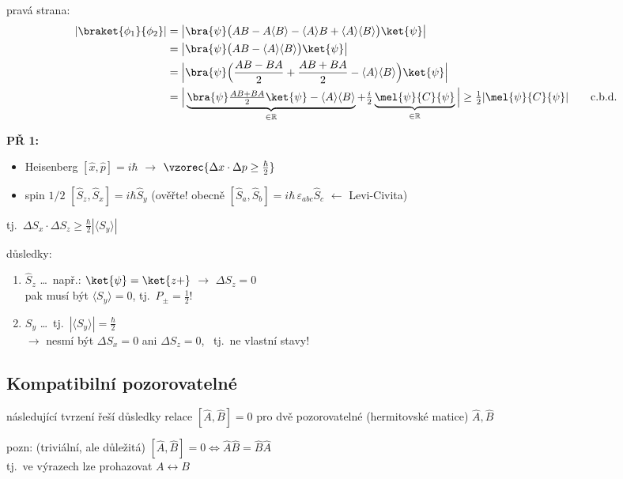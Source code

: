 \documentclass[11pt,a4paper]{article}
\begin{document}
pravá strana:
\begin{align*}
  |\braket{\phi_1}{\phi_2}| &= \big|\bra{\psi}\big(AB - A\langle B\rangle - \langle A\rangle B + \langle A\rangle\langle B\rangle\big)\ket{\psi}\big| \\
  &= \big|\bra{\psi}\big(AB - \langle A\rangle\langle B\rangle\big)\ket{\psi}\big| \\
  &= \Big|\bra{\psi}\Big(\frac{AB - BA}{2} + \frac{AB + BA}{2} - \langle A\rangle\langle B\rangle\Big)\ket{\psi}\Big| \\
  &= \Big|\underbrace{\bra{\psi}\tfrac{AB+BA}{2}\ket{\psi} - \langle A\rangle\langle B\rangle}_{\in\mathbb{R}}
     + \tfrac{i}{2}\underbrace{\mel{\psi}{C}{\psi}}_{\in\mathbb{R}}\Big|
     \geq \tfrac12|\mel{\psi}{C}{\psi}| \qquad\text{c.b.d.}
\end{align*}

\textbf{PŘ 1:}
\begin{itemize}[nosep]
  \item Heisenberg \quad $[\hat x,\hat p] = i\hbar$ \quad $\to$ \quad $\vzorec{\Delta x\cdot\Delta p \geq \frac{\hbar}{2}}$
  \item spin $1/2$ \quad $[\hat S_z,\hat S_x] = i\hbar\hat S_y$ \quad (ověřte! \quad obecně $[\hat S_a,\hat S_b] = i\hbar\,\varepsilon_{abc}\hat S_c$ \quad $\leftarrow$ Levi-Civita)
\end{itemize}
\quad tj.\ \quad $\Delta S_x\cdot\Delta S_z \geq \frac{\hbar}{2}|\langle S_y\rangle|$

důsledky:
\begin{enumerate}[label=\arabic*)]
  \item {} $\hat S_z$ \dots\ např.: $\ket{\psi} = \ket{z+}$ $\to$ $\Delta S_z = 0$ \\
        pak musí být $\langle S_y\rangle = 0$, tj.\ $P_\pm = \frac12$!
  \item {} $S_y$ \dots\ tj.\ $|\langle S_y\rangle| = \frac{\hbar}{2}$ \\
        $\to$ nesmí být $\Delta S_x = 0$ ani $\Delta S_z = 0$, \ tj.\ ne vlastní stavy!
\end{enumerate}

\subsection*{Kompatibilní pozorovatelné}
následující tvrzení řeší důsledky relace $[\hat A,\hat B] = 0$ pro dvě pozorovatelné (hermitovské matice) $\hat A,\hat B$

pozn: (triviální, ale důležitá) \quad $[\hat A,\hat B] = 0 \Leftrightarrow \hat A\hat B = \hat B\hat A$ \\
\quad tj.\ ve výrazech lze prohazovat $A\leftrightarrow B$
\end{document}
